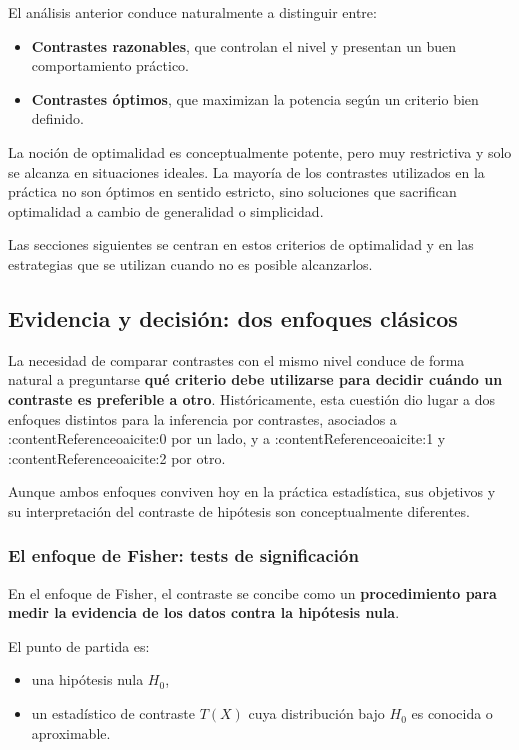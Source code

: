 \documentclass[
]{article}
\providecommand{\tightlist}{%
  \setlength{\itemsep}{0pt}\setlength{\parskip}{0pt}}
\begin{document}
El análisis anterior conduce naturalmente a distinguir entre:

\begin{itemize}
\tightlist
\item
  \textbf{Contrastes razonables}, que controlan el nivel y presentan un buen comportamiento práctico.
\item
  \textbf{Contrastes óptimos}, que maximizan la potencia según un criterio bien definido.
\end{itemize}

La noción de optimalidad es conceptualmente potente, pero muy restrictiva y solo se alcanza en situaciones ideales. La mayoría de los contrastes utilizados en la práctica no son óptimos en sentido estricto, sino soluciones que sacrifican optimalidad a cambio de generalidad o simplicidad.

Las secciones siguientes se centran en estos criterios de optimalidad y en las estrategias que se utilizan cuando no es posible alcanzarlos.

\subsection{Evidencia y decisión: dos enfoques clásicos}\label{evidencia-y-decisiuxf3n-dos-enfoques-cluxe1sicos}

La necesidad de comparar contrastes con el mismo nivel conduce de forma natural a preguntarse \textbf{qué criterio debe utilizarse para decidir cuándo un contraste es preferible a otro}. Históricamente, esta cuestión dio lugar a dos enfoques distintos para la inferencia por contrastes, asociados a :contentReference{oaicite:0} por un lado, y a :contentReference{oaicite:1} y :contentReference{oaicite:2} por otro.

Aunque ambos enfoques conviven hoy en la práctica estadística, sus objetivos y su interpretación del contraste de hipótesis son conceptualmente diferentes.

\subsubsection{El enfoque de Fisher: tests de significación}\label{el-enfoque-de-fisher-tests-de-significaciuxf3n}

En el enfoque de Fisher, el contraste se concibe como un \textbf{procedimiento para medir la evidencia de los datos contra la hipótesis nula}.

El punto de partida es:

\begin{itemize}
\tightlist
\item
  una hipótesis nula \(H_0\),
\item
  un estadístico de contraste \(T(X)\) cuya distribución bajo \(H_0\) es conocida o aproximable.
\end{itemize}
\end{document}
